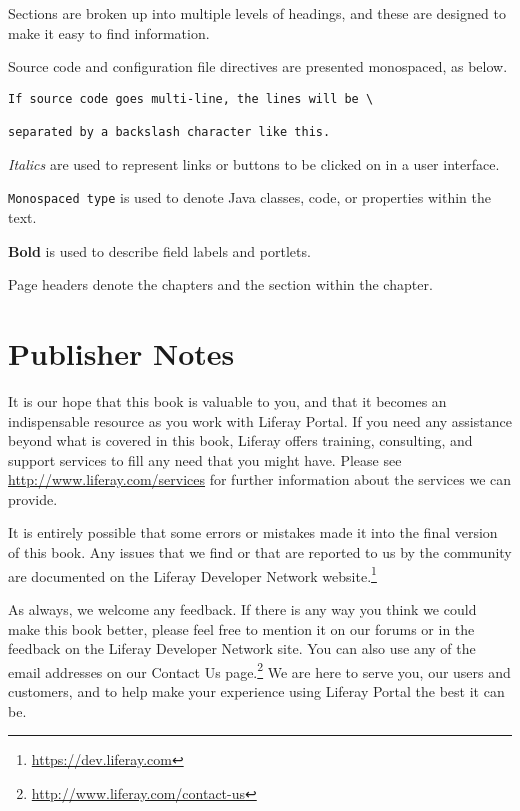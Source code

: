 \documentclass[9pt,openright,twoside]{memoir}
\begin{document}
Sections are broken up into multiple levels of headings, and these are
designed to make it easy to find information.

Source code and configuration file directives are presented monospaced, as
below.

\begin{verbatim}
If source code goes multi-line, the lines will be \

separated by a backslash character like this.

\end{verbatim}

\textit{Italics} are used to represent links or buttons to be clicked on in a
user interface.

\texttt{Monospaced type} is used to denote Java classes, code, or properties
within the text.

\textbf{Bold} is used to describe field labels and portlets.

Page headers denote the chapters and the section within the chapter.

\section{Publisher Notes}

It is our hope that this book is valuable to you, and that it becomes an
indispensable resource as you work with Liferay Portal. If you need any
assistance beyond what is covered in this book, Liferay offers training,
consulting, and support services to fill any need that you might have. Please
see \href{http://www.liferay.com/services}{http://www.liferay.com/services} for
further information about the services we can provide.

It is entirely possible that some errors or mistakes made it into the final
version of this book. Any issues that we find or that are reported to us by the
community are documented on the Liferay Developer Network website.\footnote{\href{https://dev.liferay.com}{https://dev.liferay.com}} 

As always, we welcome any feedback. If there is any way you think we
could make this book better, please feel free to mention it on our
forums or in the feedback on the Liferay Developer Network site. You can also
use any of the email addresses on our Contact Us
page.\footnote{\href{http://www.liferay.com/contact-us}{http://www.liferay.com/contact-us}}
We are here to serve you, our users and customers, and to help make your
experience using Liferay Portal the best it can be.

\mainmatter

\pagestyle{headings}
\end{document}
